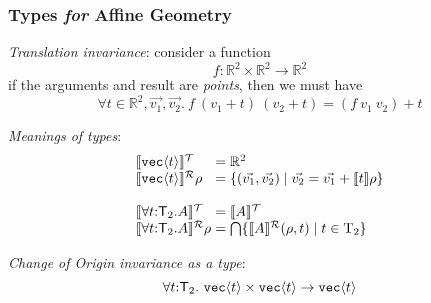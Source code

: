 \documentclass[xetex,serif,mathserif]{beamer}
\newcommand{\sepbar}{\mathrel|}
\newcommand{\Transl}[1]{\mathrm{T}_#1}
\newcommand{\SynTransl}[1]{\mathsf{T}_#1}
\newcommand{\tyPrim}[2]{\textup{\texttt{#1}}\langle #2 \rangle}
\newcommand{\tySem}[1]{\llbracket #1 \rrbracket^{\mathcal{T}}}
\newcommand{\rsem}[3]{\llbracket #1 \rrbracket^{\mathcal{R}}_{#2}{#3}}
\newenvironment{slide}[1]{\begin{frame}\frametitle{#1}}{\end{frame}}
\begin{document}
\begin{slide}{Types \emph{for} Affine Geometry}
  \textcolor{titlered}{\emph{Translation invariance}}: consider a function
  \begin{displaymath}
    f : \mathbb{R}^2 \times \mathbb{R}^2 \to \mathbb{R}^2
  \end{displaymath}
  \quad if the arguments and result are \emph{points}, then we must have
  \begin{displaymath}
    \forall t \in \mathbb{R}^2, \vec{v_1}, \vec{v_2}.~f~(v_1 + t)~(v_2 + t) = (f~v_1~v_2) + t
  \end{displaymath}

  \pause

  \textcolor{titlered}{\emph{Meanings of types}}:
  \begin{displaymath}
    \begin{array}{l@{\hspace{0.3em}}l}
      \tySem{\tyPrim{vec}{t}} & = \mathbb{R}^2 \\
      \rsem{\tyPrim{vec}{t}}{}\rho & = \{ (\vec{v_1}, \vec{v_2}) \sepbar \vec{v_2} = \vec{v_1} + \llbracket t \rrbracket \rho \} \\
      \\
      \tySem{\forall t \mathord: \SynTransl{2}. A} & = \tySem{A} \\
      \rsem{\forall t \mathord: \SynTransl{2}. A}{}\rho & = \bigcap \{ \rsem{A}{}(\rho, t) \sepbar t \in \Transl{2} \}
    \end{array}
  \end{displaymath}

  \pause

  \textcolor{titlered}{\emph{Change of Origin invariance as a type}}:
  \begin{displaymath}
    \forall t \mathord:\SynTransl{2}.~\tyPrim{vec}{t} \times \tyPrim{vec}{t} \to \tyPrim{vec}{t}
  \end{displaymath}
\end{slide}
\end{document}

